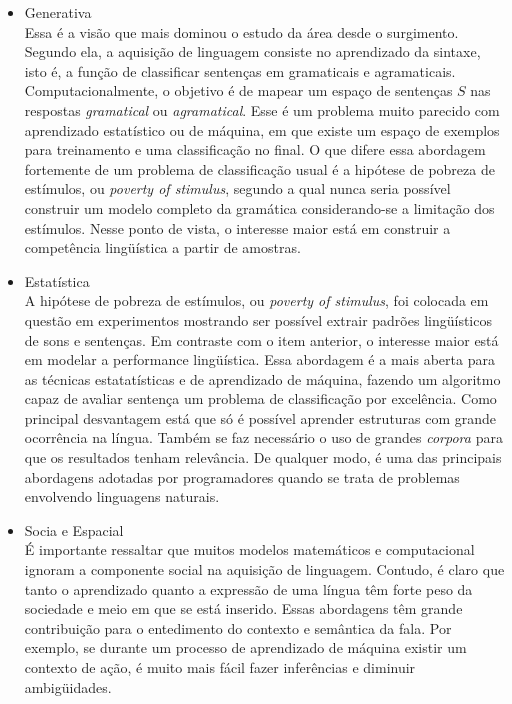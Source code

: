 \begin{itemize}
\item Generativa \\
Essa é a visão que mais dominou o estudo da área desde o surgimento. Segundo ela, a aquisição de linguagem consiste no aprendizado da sintaxe, isto é, a função de classificar sentenças em gramaticais e agramaticais. Computacionalmente, o objetivo é de mapear um espaço de sentenças $S$ nas respostas \emph{gramatical} ou \emph{agramatical}. Esse é um problema muito parecido com aprendizado estatístico ou de máquina, em que existe um espaço de exemplos para treinamento e uma classificação no final. O que difere essa abordagem fortemente de um problema de classificação usual é a hipótese de pobreza de estímulos, ou \textit{poverty of stimulus}, segundo a qual nunca seria possível construir um modelo completo da gramática considerando-se a limitação dos estímulos. Nesse ponto de vista, o interesse maior está em construir a competência lingüística a partir de amostras.

\item Estatística \\
A hipótese de pobreza de estímulos, ou \textit{poverty of stimulus}, foi colocada em questão em experimentos mostrando ser possível extrair padrões lingüísticos de sons e sentenças. Em contraste com o item anterior, o interesse maior está em modelar a performance lingüística. Essa abordagem é a mais aberta para as técnicas estatatísticas e de aprendizado de máquina, fazendo um algoritmo capaz de avaliar sentença um problema de classificação por excelência. Como principal desvantagem está que só é possível aprender estruturas com grande ocorrência na língua. Também se faz necessário o uso de grandes \emph{corpora} para que os resultados tenham relevância. De qualquer modo, é uma das principais abordagens adotadas por programadores quando se trata de problemas envolvendo linguagens naturais.

\item Socia e Espacial \\
É importante ressaltar que muitos modelos matemáticos e computacional ignoram a componente social na aquisição de linguagem. Contudo, é claro que tanto o aprendizado quanto a expressão de uma língua têm forte peso da sociedade e meio em que se está inserido. Essas abordagens têm grande contribuição para o entedimento do contexto e semântica da fala. Por exemplo, se durante um processo de aprendizado de máquina existir um contexto de ação, é muito mais fácil fazer inferências e diminuir ambigüidades.


\end{itemize}
